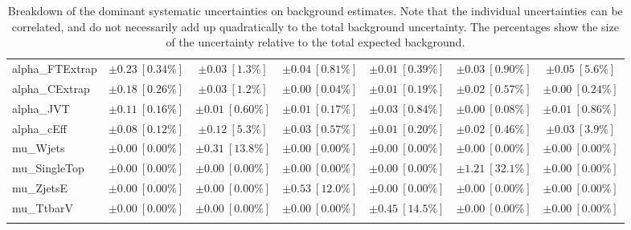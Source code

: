 \begin{sidewaystable}
\begin{center}
\begin{tabular*}{\textwidth}{@{\extracolsep{\fill}}lcccccc}
alpha\_FTExtrap         & $\pm 0.23\ [0.34\%] $          & $\pm 0.03\ [1.3\%] $          & $\pm 0.04\ [0.81\%] $          & $\pm 0.01\ [0.39\%] $          & $\pm 0.03\ [0.90\%] $          & $\pm 0.05\ [5.6\%] $       \\
alpha\_CExtrap         & $\pm 0.18\ [0.26\%] $          & $\pm 0.03\ [1.2\%] $          & $\pm 0.00\ [0.04\%] $          & $\pm 0.01\ [0.19\%] $          & $\pm 0.02\ [0.57\%] $          & $\pm 0.00\ [0.24\%] $       \\
alpha\_JVT         & $\pm 0.11\ [0.16\%] $          & $\pm 0.01\ [0.60\%] $          & $\pm 0.01\ [0.17\%] $          & $\pm 0.03\ [0.84\%] $          & $\pm 0.00\ [0.08\%] $          & $\pm 0.01\ [0.86\%] $       \\
alpha\_cEff         & $\pm 0.08\ [0.12\%] $          & $\pm 0.12\ [5.3\%] $          & $\pm 0.03\ [0.57\%] $          & $\pm 0.01\ [0.20\%] $          & $\pm 0.02\ [0.46\%] $          & $\pm 0.03\ [3.9\%] $       \\
mu\_Wjets         & $\pm 0.00\ [0.00\%] $          & $\pm 0.31\ [13.8\%] $          & $\pm 0.00\ [0.00\%] $          & $\pm 0.00\ [0.00\%] $          & $\pm 0.00\ [0.00\%] $          & $\pm 0.00\ [0.00\%] $       \\
mu\_SingleTop         & $\pm 0.00\ [0.00\%] $          & $\pm 0.00\ [0.00\%] $          & $\pm 0.00\ [0.00\%] $          & $\pm 0.00\ [0.00\%] $          & $\pm 1.21\ [32.1\%] $          & $\pm 0.00\ [0.00\%] $       \\
mu\_ZjetsE         & $\pm 0.00\ [0.00\%] $          & $\pm 0.00\ [0.00\%] $          & $\pm 0.53\ [12.0\%] $          & $\pm 0.00\ [0.00\%] $          & $\pm 0.00\ [0.00\%] $          & $\pm 0.00\ [0.00\%] $       \\
mu\_TtbarV         & $\pm 0.00\ [0.00\%] $          & $\pm 0.00\ [0.00\%] $          & $\pm 0.00\ [0.00\%] $          & $\pm 0.45\ [14.5\%] $          & $\pm 0.00\ [0.00\%] $          & $\pm 0.00\ [0.00\%] $       \\
\noalign{\smallskip}\hline\noalign{\smallskip}
\end{tabular*}
\end{center}
\caption[Breakdown of uncertainty on background estimates]{
Breakdown of the dominant systematic uncertainties on background estimates.
Note that the individual uncertainties can be correlated, and do not necessarily add up quadratically to 
the total background uncertainty. The percentages show the size of the uncertainty relative to the total expected background.
\label{table.results.bkgestimate.uncertainties.VRTopE_bybkg}}
\end{sidewaystable}
%